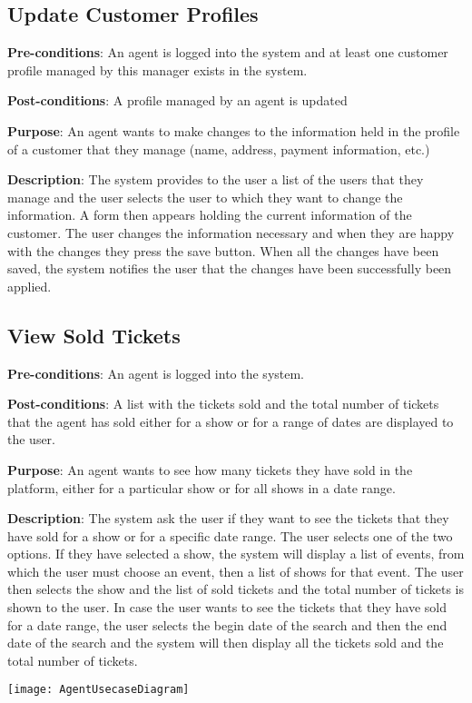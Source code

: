 \subsection{Update Customer Profiles}
\textbf{Pre-conditions}: An agent is logged into the system and at least
one customer profile managed by this manager exists in the system.

\textbf{Post-conditions}: A profile managed by an agent is updated

\textbf{Purpose}: An agent wants to make changes to the information
held in the profile of a customer that they manage (name, address,
payment information, etc.)

\textbf{Description}: The system provides to the user a list of the
users that they manage and the user selects the user to which
they want to change the information. A form then appears holding the
current information of the customer. The user changes the information
necessary and when they are happy with the changes they press the save
button. When all the changes have been saved, the system notifies
the user that the changes have been successfully been applied.

\subsection{View Sold Tickets}
\textbf{Pre-conditions}: An agent is logged into the system.

\textbf{Post-conditions}: A list with the tickets sold and the total number
of tickets that the agent has sold either for a show or for a range of dates
are displayed to the user.

\textbf{Purpose}: An agent wants to see how many tickets they have sold in the
platform, either for a particular show or for all shows in a date range.

\textbf{Description}: The system ask the user if they want to see the tickets that
they have sold for a show or for a specific date range. The user selects one of the two
options. If they have selected a show, the system will display a list of events, from
which the user must choose an event, then a list of shows for that event. The user then
selects the show and the list of sold tickets and the total number of tickets is shown
to the user. In case the user wants to see the tickets that they have sold for a date
range, the user selects the begin date of the search and then the end date of the
search and the system will then display all the tickets sold and the total number of
tickets.

\texttt{[image: AgentUsecaseDiagram]}
